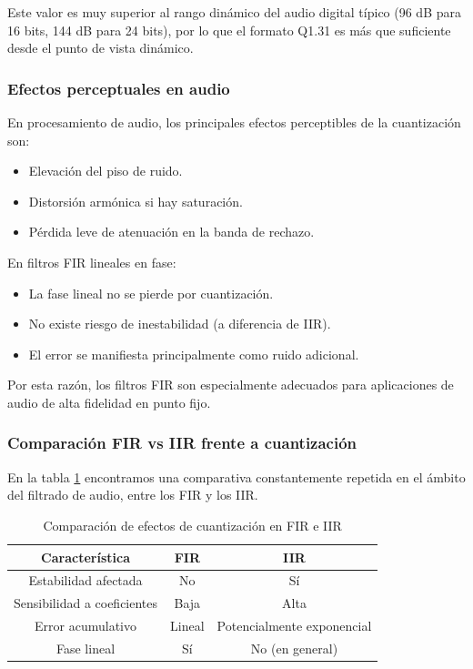 \documentclass[a4,11pt]{article}
\begin{document}
Este valor es muy superior al rango dinámico del audio digital típico (96 dB para 16 bits, 144 dB para 24 bits), por lo que el formato Q1.31 es más que suficiente desde el punto de vista dinámico.

\subsubsection{Efectos perceptuales en audio}
\label{subsubsec:efectos_audio}

En procesamiento de audio, los principales efectos perceptibles de la cuantización son:

\begin{itemize}
\item Elevación del piso de ruido.
\item Distorsión armónica si hay saturación.
\item Pérdida leve de atenuación en la banda de rechazo.
\end{itemize}

En filtros FIR lineales en fase:

\begin{itemize}
\item La fase lineal no se pierde por cuantización.
\item No existe riesgo de inestabilidad (a diferencia de IIR).
\item El error se manifiesta principalmente como ruido adicional.
\end{itemize}

Por esta razón, los filtros FIR son especialmente adecuados para aplicaciones de audio de alta fidelidad en punto fijo.

\subsubsection{Comparación FIR vs IIR frente a cuantización}
\label{subsubsec:comparacion_cuantizacion}
En la tabla \ref{tab:fir_iir_cuantizacion} encontramos una comparativa constantemente repetida en el ámbito del filtrado de audio, entre los FIR y los IIR.
\begin{table}[h]
\centering
\label{tab:fir_iir_cuantizacion}
\begin{tabular}{|c|c|c|}
\hline
Característica & FIR & IIR \\
\hline
Estabilidad afectada & No & Sí \\
Sensibilidad a coeficientes & Baja & Alta \\
Error acumulativo & Lineal & Potencialmente exponencial \\
Fase lineal & Sí & No (en general) \\
\hline
\end{tabular}
\caption{Comparación de efectos de cuantización en FIR e IIR}
\end{table}
\end{document}
